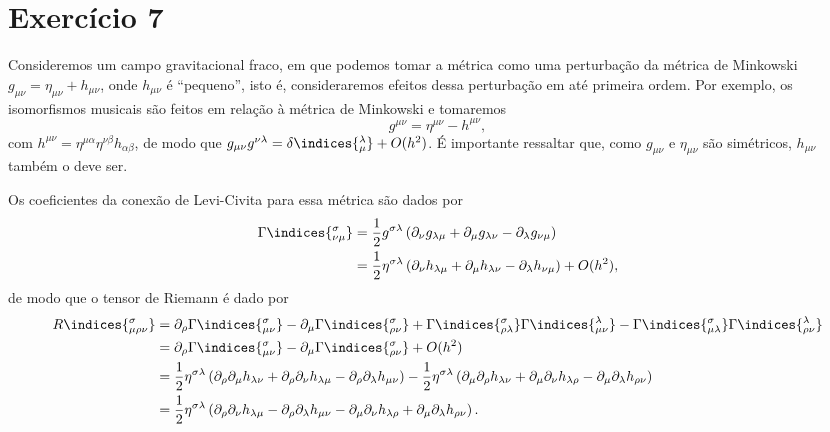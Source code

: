 \section*{Exercício 7}
Consideremos um campo gravitacional fraco, em que podemos tomar a métrica como uma perturbação da métrica de Minkowski \(g_{\mu\nu} = \eta_{\mu\nu} + h_{\mu\nu}\), onde \(h_{\mu\nu}\) é \enquote{pequeno}, isto é, consideraremos efeitos dessa perturbação em até primeira ordem. Por exemplo, os isomorfismos musicais são feitos em relação à métrica de Minkowski e tomaremos
\begin{equation*}
    g^{\mu\nu} = \eta^{\mu\nu} - h^{\mu\nu},
\end{equation*}
com \(h^{\mu\nu} = \eta^{\mu \alpha}\eta^{\nu \beta}h_{\alpha \beta}\), de modo que \(g_{\mu\nu}g^{\nu \lambda} = \delta\indices{^\lambda_\mu} + O(h^2)\). É importante ressaltar que, como \(g_{\mu\nu}\) e \(\eta_{\mu\nu}\) são simétricos, \(h_{\mu\nu}\) também o deve ser.

Os coeficientes da conexão de Levi-Civita para essa métrica são dados por
\begin{align*}
    \Gamma\indices{^\sigma_{\nu\mu}} &= \frac12 g^{\sigma \lambda}\left(\partial_{\nu}g_{\lambda \mu} + \partial_{\mu}g_{\lambda\nu} - \partial_{\lambda}g_{\nu\mu}\right)\\
                                     &= \frac12 \eta^{\sigma \lambda}\left(\partial_{\nu}h_{\lambda \mu} + \partial_{\mu}h_{\lambda\nu} - \partial_{\lambda}h_{\nu\mu}\right) + O(h^2),
\end{align*}
de modo que o tensor de Riemann é dado por
\begin{align*}
    R\indices{^\sigma_{\mu \rho \nu}} &= \partial_{\rho}\Gamma\indices{^{\sigma}_{\mu\nu}}- \partial_{\mu}\Gamma\indices{^{\sigma}_{\rho\nu}} + \Gamma\indices{^\sigma_{\rho\lambda}} \Gamma\indices{^\lambda_{\mu\nu}} - \Gamma\indices{^\sigma_{\mu\lambda}} \Gamma\indices{^\lambda_{\rho\nu}}\\
                                      &=\partial_{\rho}\Gamma\indices{^{\sigma}_{\mu\nu}}- \partial_{\mu}\Gamma\indices{^{\sigma}_{\rho\nu}} + O(h^2)\\
                                     &= \frac12 \eta^{\sigma \lambda}\left(\partial_\rho\partial_{\mu}h_{\lambda \nu} + \partial_\rho\partial_{\nu}h_{\lambda\mu} - \partial_\rho\partial_{\lambda}h_{\mu\nu}\right) - \frac12 \eta^{\sigma \lambda}\left(\partial_\mu\partial_{\rho}h_{\lambda \nu} + \partial_\mu\partial_{\nu}h_{\lambda\rho} - \partial_\mu\partial_{\lambda}h_{\rho\nu}\right)\\
                                     &= \frac12 \eta^{\sigma \lambda}\left(\partial_\rho\partial_{\nu}h_{\lambda\mu} - \partial_\rho\partial_{\lambda}h_{\mu\nu} - \partial_\mu\partial_{\nu}h_{\lambda\rho} + \partial_\mu\partial_{\lambda}h_{\rho\nu}\right).
\end{align*}

